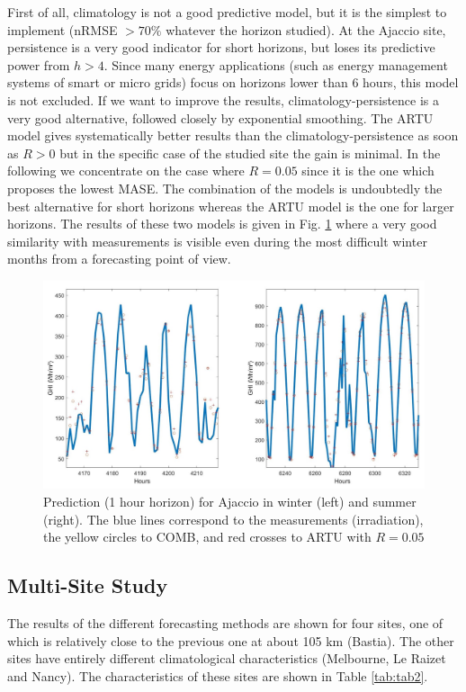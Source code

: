 First of all, climatology is not a good predictive model, but it is the simplest to implement (nRMSE $> 70\%$ whatever the horizon studied). 
At the Ajaccio site, persistence is a very good indicator for short horizons, but loses its predictive power from $h>4$. Since many energy applications (such as energy management systems of smart or micro grids) focus on horizons lower than 6 hours, this model is not excluded. 
If we want to improve the results, climatology-persistence is a very good alternative, followed closely by exponential smoothing. The ARTU model gives systematically better results than the climatology-persistence as soon as $R>0$ but in the specific case of the studied site the gain is minimal. In the following we concentrate on the case where $R=0.05$ since it is the one which proposes the lowest MASE. The combination of the models is undoubtedly the best alternative for  short horizons whereas the ARTU model is the one for larger horizons. The results of these two models is given in  Fig. \ref{fig:fig3} where a very good similarity with measurements is visible even during the most difficult winter months from a forecasting point of view.

\begin{figure}[tb]
\includegraphics[scale=0.45]{fig3.jpg}%
\caption{Prediction (1 hour horizon) for Ajaccio in winter (left) and summer (right). The blue lines correspond to the measurements (irradiation), the yellow circles to COMB, and red crosses to ARTU with $R=0.05$} 
\label{fig:fig3}
\end{figure}

\subsection{Multi-Site Study}
\label{sec:multi}
The results of the different forecasting methods are shown for four sites, one of which is relatively close to the previous one at about 105 km (Bastia). The other sites have entirely different climatological characteristics (Melbourne, Le Raizet and Nancy). The characteristics of these sites are shown in Table \ref{tab:tab2}.

